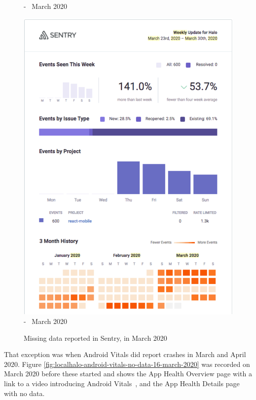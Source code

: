 \begin{figure}[htbp!]
\begin{minipage}{.49\linewidth}
  {\footnotesize {} -~ March 2020}
  \label{fig:localhalo-sentry-weekly-report-16-mar-2020}
\end{minipage}\hfill%
\begin{minipage}{.49\linewidth}
  \centering
  \includegraphics[width=\textwidth]{images/localhalo/sentry-weekly-report-23-mar-2020.pdf}
  {\footnotesize {} -~ March 2020}
  \label{fig:localhalo-sentry-weekly-report-23-mar-2020}
\end{minipage}
    \caption{Missing data reported in Sentry, in March 2020}
    \label{fig:sentry-missing-data-march-2020}
\end{figure}

That exception was when Android Vitals did report crashes in March and April 2020. Figure \ref{fig:localhalo-android-vitals-no-data-16-march-2020} was recorded on  March 2020 before these started and shows the App Health Overview page with a link to a video introducing Android Vitals~, and the App Health Details page with no data.

